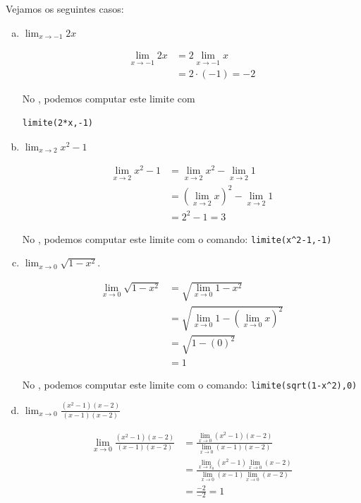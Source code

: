 \cleardoublepage\documentclass[../main.tex]{subfiles}
\begin{document}
\vspace{0.1cm}
\begin{ex}
  Vejamos os seguintes casos:
  \begin{enumerate}[a)]
  \item $\displaystyle \lim_{x\to -1} 2x$
  \begin{solution}
  \begin{align*}
    \lim_{x\to -1} 2x &= 2\lim_{x\to -1} x\\
    &= 2\cdot(-1) = -2
  \end{align*}

  No \geogebra, podemos computar este limite com
\begin{verbatim}
limite(2*x,-1)
\end{verbatim}
  \end{solution}
  \item $\displaystyle \lim_{x\to 2} x^2 - 1$
  \begin{solution}
  \begin{align*}
    \lim_{x\to 2} x^2 - 1 &= \lim_{x\to 2} x^2 - \lim_{x\to 2} 1\\
                          &= \left(\lim_{x\to 2} x\right)^2 - \lim_{x\to 2} 1\\
    &= 2^2 - 1 = 3
  \end{align*}

  No \geogebra, podemos computar este limite com o comando: \verb+limite(x^2-1,-1)+
  \end{solution}
  \item $\displaystyle \lim_{x\to 0} \sqrt{1-x^2}$.
  \begin{solution}
  \begin{align*}
    \lim_{x\to 0} \sqrt{1-x^2} &= \sqrt{\lim_{x\to 0} 1-x^2}\\
                                &= \sqrt{\lim_{x\to 0} 1 - \left(\lim_{x\to 0} x\right)^2}\\
                                &= \sqrt{1 - (0)^2} \\
                                &= 1
  \end{align*}
  
  No \geogebra, podemos computar este limite com o comando: \verb+limite(sqrt(1-x^2),0)+
  \end{solution}
  
\item $\displaystyle \lim_{x\to 0} \frac{(x^2-1)(x-2)}{(x-1)(x-2)}$
\begin{solution}
    \begin{align*}
    \lim_{x\to 0} \frac{(x^2-1)(x-2)}{(x-1)(x-2)} &= \frac{\displaystyle\lim_{x\to 0}(x^2-1)(x-2)}{\displaystyle\lim_{x\to 0} (x-1)(x-2)}\\
                                                  &= \frac{\displaystyle\lim_{x\to x_0} (x^2-1)\lim_{x\to 0}(x-2)}{\displaystyle\lim_{x\to 0}(x-1)\lim_{x\to 0}(x-2)}\\
    &= \frac{-2}{-2} = 1
  \end{align*}
\end{solution}

  \end{enumerate}
\end{ex}
\end{document}
